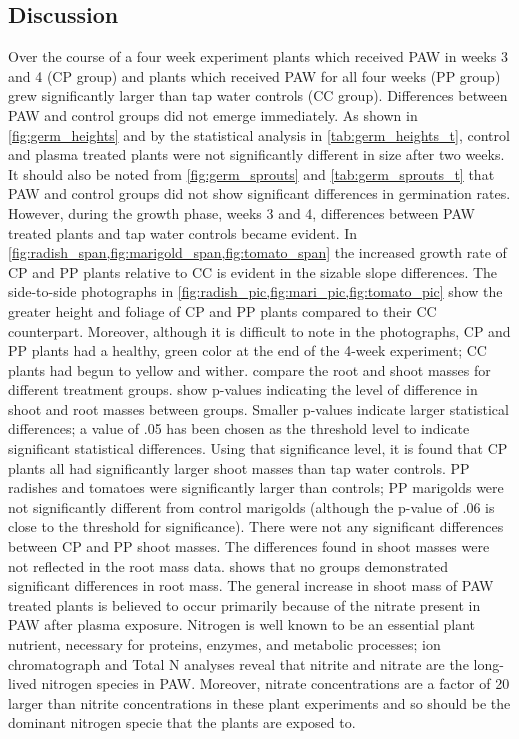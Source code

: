 \subsection{Discussion}

Over the course of a four week experiment plants which received PAW in weeks 3 and 4 (CP group) and plants which received PAW for all four weeks (PP group) grew significantly larger than tap water controls (CC group).  Differences between PAW and control groups did not emerge immediately.  As shown in \cref{fig:germ_heights} and by the statistical analysis in \cref{tab:germ_heights_t}, control and plasma treated plants were not significantly different in size after two weeks.  It should also be noted from \cref{fig:germ_sprouts} and \cref{tab:germ_sprouts_t} that PAW and control groups did not show significant differences in germination rates.  However, during the growth phase, weeks 3 and 4, differences between PAW treated plants and tap water controls became evident.  In \cref{fig:radish_span,fig:marigold_span,fig:tomato_span} the increased growth rate of CP and PP plants relative to CC is evident in the sizable slope differences.  The side-to-side photographs in \cref{fig:radish_pic,fig:mari_pic,fig:tomato_pic} show the greater height and foliage of CP and PP plants compared to their CC counterpart.  Moreover, although it is difficult to note in the photographs, CP and PP plants had a healthy, green color at the end of the 4-week experiment; CC plants had begun to yellow and wither.   compare the root and shoot masses for different treatment groups.   show p-values indicating the level of difference in shoot and root masses between groups.  Smaller p-values indicate larger statistical differences; a value of .05 has been chosen as the threshold level to indicate significant statistical differences.  Using that significance level, it is found that CP plants all had significantly larger shoot masses than tap water controls.  PP radishes and tomatoes were significantly larger than controls; PP marigolds were not significantly different from control marigolds (although the p-value of .06 is close to the threshold for significance).  There were not any significant differences between CP and PP shoot masses.  The differences found in shoot masses were not reflected in the root mass data.   shows that no groups demonstrated significant differences in root mass.   The general increase in shoot mass of PAW treated plants is believed to occur primarily because of the nitrate present in PAW after plasma exposure.  Nitrogen is well known to be an essential plant nutrient, necessary for proteins, enzymes, and metabolic processes; ion chromatograph and Total N analyses reveal that nitrite and nitrate are the long-lived nitrogen species in PAW.  Moreover, nitrate concentrations are a factor of 20 larger than nitrite concentrations in these plant experiments and so should be the dominant nitrogen specie that the plants are exposed to.

